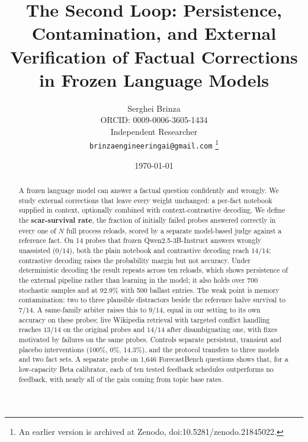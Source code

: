\documentclass[11pt]{article}
\title{\textbf{The Second Loop: Persistence, Contamination, and External
Verification of Factual Corrections in Frozen Language Models}}
\author{
  Serghei Brinza\\
  ORCID: 0009-0006-3605-1434\\
  Independent Researcher\\
  \texttt{brinzaengineeringai@gmail.com}%
  \thanks{An earlier version is archived at Zenodo, doi:10.5281/zenodo.21845022.}
}
\date{\today}
\newcommand{\scar}{scar\nobreakdash-survival rate}
\begin{document}
\maketitle

\begingroup
\renewcommand\thefootnote{}
\endgroup

\begin{abstract}
A frozen language model can answer a factual question confidently and wrongly.
We study external corrections that leave every weight unchanged: a per-fact
notebook supplied in context, optionally combined with context-contrastive
decoding. We define the \textbf{\scar{}}, the fraction of initially failed
probes answered correctly in every one of $N$ full process reloads, scored by a
separate model-based judge against a reference fact. On 14 probes that frozen
Qwen2.5-3B-Instruct answers wrongly unassisted ($0/14$), both the plain notebook
and contrastive decoding reach $14/14$; contrastive decoding raises the
probability margin but not accuracy. Under deterministic decoding the result
repeats across ten reloads, which shows persistence of the external pipeline
rather than learning in the model; it also holds over 700 stochastic samples
and at 92.9\% with 500 ballast entries. The weak point is memory contamination:
two to three plausible distractors beside the reference halve survival to
$7/14$. A same-family arbiter raises this to $9/14$, equal in our setting to its
own accuracy on these probes; live Wikipedia retrieval with targeted conflict
handling reaches $13/14$ on the original probes and $14/14$ after
disambiguating one, with fixes motivated by failures on the same probes.
Controls separate persistent, transient and placebo interventions (100\%, 0\%,
14.3\%), and the protocol transfers to three models and two fact sets. A
separate probe on 1{,}646 ForecastBench questions shows that, for a
low-capacity Beta calibrator, each of ten tested feedback schedules outperforms
no feedback, with nearly all of the gain coming from topic base rates.
\end{abstract}

\end{document}
